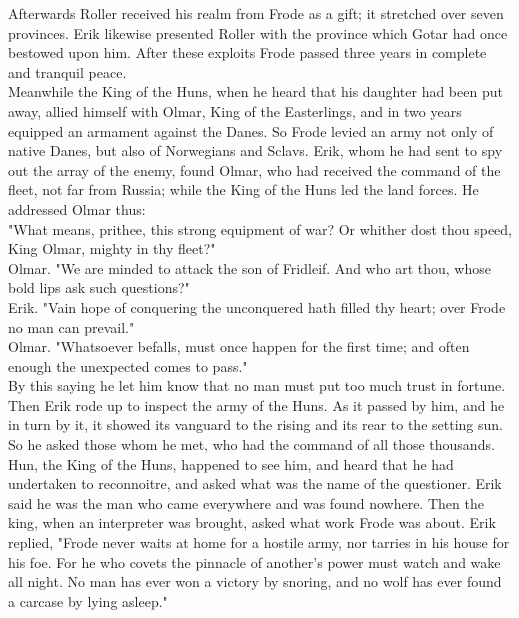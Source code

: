 \documentclass[10pt,a4paper]{report}
\begin{document}
Afterwards Roller received his realm from Frode as a gift; it stretched over seven provinces. Erik likewise presented Roller with the province which Gotar had once bestowed upon him. After these exploits Frode passed three years in complete and tranquil peace.\\

Meanwhile the King of the Huns, when he heard that his daughter had been put away, allied himself with Olmar, King of the Easterlings, and in two years equipped an armament against the Danes. So Frode levied an army not only of native Danes, but also of Norwegians and Sclavs. Erik, whom he had sent to spy out the array of the enemy, found Olmar, who had received the command of the fleet, not far from Russia; while the King of the Huns led the land forces. He addressed Olmar thus:\\

"What means, prithee, this strong equipment of war? Or whither dost thou speed, King Olmar, mighty in thy fleet?"\\

Olmar. "We are minded to attack the son of Fridleif. And who art thou, whose bold lips ask such questions?"\\

Erik. "Vain hope of conquering the unconquered hath filled thy heart; over Frode no man can prevail."\\

Olmar. "Whatsoever befalls, must once happen for the first time; and often enough the unexpected comes to pass."\\

By this saying he let him know that no man must put too much trust in fortune. Then Erik rode up to inspect the army of the Huns. As it passed by him, and he in turn by it, it showed its vanguard to the rising and its rear to the setting sun. So he asked those whom he met, who had the command of all those thousands. Hun, the King of the Huns, happened to see him, and heard that he had undertaken to reconnoitre, and asked what was the name of the questioner. Erik said he was the man who came everywhere and was found nowhere. Then the king, when an interpreter was brought, asked what work Frode was about. Erik replied, "Frode never waits at home for a hostile army, nor tarries in his house for his foe. For he who covets the pinnacle of another's power must watch and wake all night. No man has ever won a victory by snoring, and no wolf has ever found a carcase by lying asleep."\\
\end{document}

